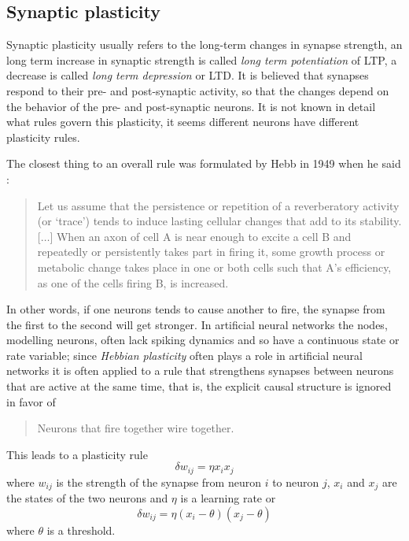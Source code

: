 \documentclass[11pt,a4paper]{scrartcl}
\begin{document}
\subsection*{Synaptic plasticity}

Synaptic plasticity usually refers to the long-term changes in synapse
strength, an long term increase in synaptic strength is called
\textsl{long term potentiation} of LTP, a decrease is called
\textsl{long term depression} or LTD. It is believed that synapses
respond to their pre- and post-synaptic activity, so that the changes
depend on the behavior of the pre- and post-synaptic neurons. It is
not known in detail what rules govern this plasticity, it seems
different neurons have different plasticity rules. 

The closest thing to an overall rule was formulated by Hebb in 1949
when he said \cite{Hebb1949a}:
\begin{quote}
Let us assume that the persistence or repetition of a reverberatory
activity (or \lq{}trace\rq{}) tends to induce lasting cellular changes that
add to its stability. [$\ldots$] When an axon of cell A is near enough to excite
a cell B and repeatedly or persistently takes part in firing it, some
growth process or metabolic change takes place in one or both cells
such that A's efficiency, as one of the cells firing B, is increased.
\end{quote}
In other words, if one neurons tends to cause another to fire, the
synapse from the first to the second will get stronger. In artificial
neural networks the nodes, modelling neurons, often lack spiking
dynamics and so have a continuous state or rate variable; since
\textsl{Hebbian plasticity} often plays a role in artificial neural
networks it is often applied to a rule that strengthens synapses between neurons that are active at the same time, that is, the explicit causal structure is ignored in favor of 
\begin{quote}
Neurons that fire together wire together.
\end{quote}
This leads to a plasticity rule 
\begin{equation}
\delta w_{ij}=\eta x_i x_j
\end{equation}
where $w_{ij}$ is the strength of the synapse from neuron $i$ to
neuron $j$, $x_i$ and $x_j$ are the states of the two neurons and
$\eta$ is a learning rate or
\begin{equation}
\delta w_{ij}=\eta (x_i-\theta)(x_j-\theta)
\end{equation}
where $\theta$ is a threshold. 
\end{document}
